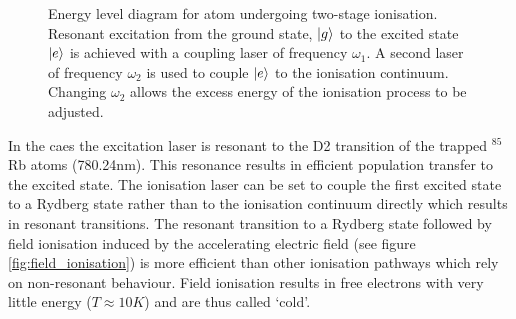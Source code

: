 \begin{figure}
\centering
{}
\caption[Title]{Energy level diagram for atom undergoing two-stage ionisation. Resonant excitation from the ground state, $\ket{g}$ to the excited state $\ket{e}$ is achieved with a coupling laser of frequency $\omega_1$. A second laser of frequency $\omega_2$ is used to couple $\ket{e}$ to the ionisation continuum. Changing $\omega_2$ allows the excess energy of the ionisation process to be adjusted.}
\label{fig:energy_level}
\end{figure}

In the \gls{caes} the excitation laser is resonant to the D2 transition of the trapped $^{85}$Rb atoms (780.24nm). This resonance results in efficient population transfer to the excited state. The ionisation laser can be set to couple the first excited state to a Rydberg state rather than to the ionisation continuum directly which results in resonant transitions. The resonant transition to a Rydberg state followed by field ionisation induced by the accelerating electric field (see figure \ref{fig:field_ionisation}) is more efficient than other ionisation pathways which rely on non-resonant behaviour. Field ionisation results in free electrons with very little energy ($T\approx10K$\cite{mcculloch_arbitrarily_2011}) and are thus called `cold'.

